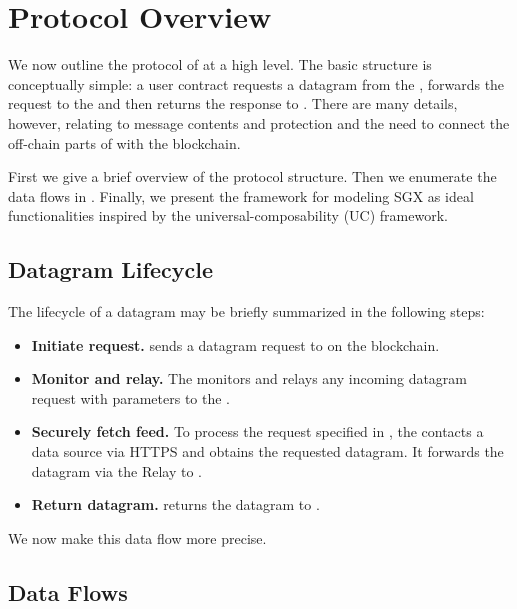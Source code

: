 \section{\tc Protocol Overview}
\label{sec:protocols}
We now outline the protocol of \tc at a high level.
The basic structure is conceptually simple:
a user contract \reqcont requests a datagram from the \tcontract \tcont, \tcont forwards the request to the \encname and then returns the response to \reqcont.
There are many details, however, relating to message contents and protection and the need to connect the off-chain parts of \tc with the blockchain.

First we give a brief overview of the protocol structure.
Then we enumerate the data flows in \tc.
Finally, we present the framework for modeling SGX as ideal functionalities inspired by the universal-composability (UC) framework.

\subsection{Datagram Lifecycle}

The lifecycle of a datagram may be briefly summarized in the following steps:

\vspace{-1ex}
\begin{itemize}
  \setlength{\itemsep}{2pt}
  \setlength{\parskip}{0pt}
  \setlength{\parsep}{0pt}
\item {\bf Initiate request.} \reqcont sends a datagram request to \tcont on the blockchain.

\item {\bf Monitor and relay.} The \medname monitors \tcont and relays any incoming datagram request with parameters \dgform to the \encname.

\item {\bf Securely fetch feed.} To process the request specified in \dgform, the \encname contacts a data source via HTTPS and obtains the requested datagram. It forwards the datagram via the Relay to \tcont.

\item {\bf Return datagram.} \tcont returns the datagram to \reqcont.
\end{itemize}
\vspace{-1ex}

\noindent We now make this data flow more precise. 

\subsection{Data Flows}
\label{sec:protocol-data-flows}

